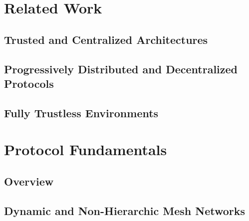 \newpage
\section{Related Work} \label{sec:related-work}



\subsection{Trusted and Centralized Architectures} \label{sec:related-work-trusted-centralized}



\subsection{Progressively Distributed and Decentralized Protocols} \label{sec:related-work-distributed-decentralized}



\subsection{Fully Trustless Environments} \label{sec:related-work-fully-trustless}




% 

\newpage
\section{Protocol Fundamentals} \label{sec:protocol-fundamentals}



\subsection{Overview} \label{sec:protocol-fundamentals-overview}



\subsection{Dynamic and Non-Hierarchic Mesh Networks} \label{sec:protocol-fundamentals-mesh}

